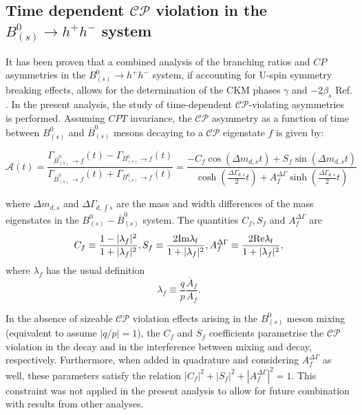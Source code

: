 \documentclass[12pt]{article}
\def\CP                {{\ensuremath{C\!P}}\xspace}
\begin{document}


\subsection{Time dependent $\mathcal{CP}$ violation in the $B^0_{(s)}\rightarrow h^+h^-$ system}
It has been proven that a combined analysis of the branching ratios and \CP asymmetries in the $B^0_{(s)}\rightarrow h^+h^-$ system, if accounting for U-spin symmetry breaking effects, allows for the determination of the CKM phases $\gamma$ and $-2\beta_s$ Ref. \cite{uspin1,uspin2}. In the present analysis, the study of time-dependent $\mathcal{CP}$-violating asymmetries is performed. Assuming $CPT$ invariance, the $\mathcal{CP}$ asymmetry as a function of time between $B_{(s)}^0$ and $\overline{B}^0_{(s)}$ mesons decaying to a $\mathcal{CP}$ eigenstate $f$ is given by:

\begin{equation}
\mathcal{A}(t) = \frac{\Gamma_{\overline{B}^0_{(s)}\rightarrow f}(t) -  \Gamma_{B^0_{(s)}\rightarrow f}(t)}{\Gamma_{\overline{B}^0_{(s)}\rightarrow f}(t) +  \Gamma_{B^0_{(s)}\rightarrow f}(t) } = \frac{-C_f\cos(\Delta m_{d,s}t) + S_f\sin(\Delta m_{d,s}t)}{\cosh \left(\frac{\Delta\Gamma_{d,s}}{2}t\right) + A^{\Delta\Gamma}_f \sinh\left(\frac{\Delta\Gamma_{d,s}}{2}t\right)}
\end{equation}

where $\Delta m_{d,s}$ and $\Delta\Gamma_{d,∫s}$ are the mass and width differences of the mass eigenstates in the $B^0_{(s)} - \overline{B}^0_{(s)}$ system. The quantities $C_f, S_f$ and $A^{\Delta\Gamma}_f$ are
\begin{equation}
C_f \equiv \frac{1-|\lambda_f|^2}{1+|\lambda_f|^2}, S_f\equiv \frac{2\rm{Im}\lambda_f}{1+|\lambda_f|^2}, A^{\Delta\Gamma}_f \equiv \frac{2\rm{Re}\lambda_f}{1+|\lambda_f|^2},
\end{equation}
where $\lambda_f$ has the usual definition
\begin{equation}
\lambda_f \equiv \frac{q}{p}\frac{\overline{A}_f}{A_f}.
\end{equation}

In the absence of sizeable $\mathcal{CP}$ violation effects arising in the $B^0_{(s)}$ meson mixing (equivalent to assume $|q/p|=1$), the $C_f$ and $S_f$ coefficients parametrise the $\mathcal{CP}$ violation in the decay and in the interference between mixing and decay, respectively. Furthermore, when added in quadrature and considering $A^{\Delta\Gamma}_f$ as well, these parameters satisfy the relation $|C_f|^2 + |S_f|^2 +|A^{\Delta\Gamma}_f|^2 = 1$. This constraint was not applied in the present analysis to allow for future combination with results from other analyses. 
\end{document}
